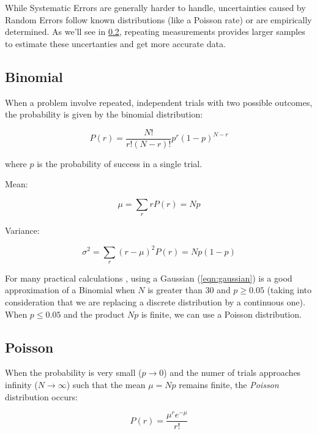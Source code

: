 While Systematic Errors are generally harder to handle, uncertainties caused by Random Errors follow known distributions (like a Poisson rate) or are empirically determined. As we'll see in \ref{distributions1}, repeating measurements provides larger samples to estimate these uncertanties and get more accurate data.


\subsection{Binomial}

When a problem involve repeated, independent trials with two possible outcomes, the probability is given by the binomial distribution:

\begin{equation}
	P(r)= \frac{N! }{ r! \left( N-r \right)! } p^r (1-p)^{N-r}
\end{equation}

where $p$ is the probability of success in a single trial.


Mean:

\begin{equation}
	\mu = \sum_{r}rP(r) = Np
\end{equation}

Variance:

\begin{equation}
	\sigma^2=\sum_r(r-\mu)^2P(r) = Np(1-p)
\end{equation}

For many practical calculations \cite{leo2012techniques}, using a Gaussian (\ref{eqn:gaussian}) is a good approximation of a Binomial when $N$ is greater than 30 and $p\geq0.05$ (taking into consideration that we are replacing a discrete distribution by a continuous one). When $p\leq0.05$ and the product $Np$ is finite, we can use a Poisson distribution.

\subsection{Poisson}
\label{distributions1}

When the probability is very small ($p \rightarrow 0$) and the numer of trials approaches infinity ($N \rightarrow \infty$) such that the mean $\mu = N p$ remains finite, the \textit{Poisson} distribution occurs:


\begin{equation}
	\label{eqn:poisson}
	P\left( r \right) = \frac{{\mu^{ r } e ^{-\mu} }}{{r!}}
\end{equation}

